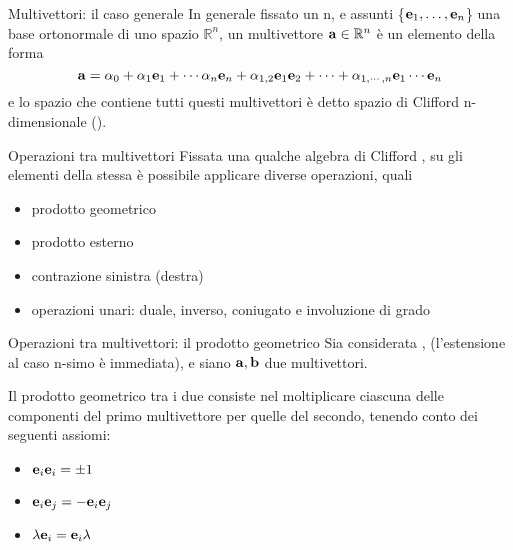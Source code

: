 \begin{frame}{Multivettori: il caso generale}
    In generale fissato un n, e assunti \{\(\mathbf{e}_{1}, \ldots, \mathbf{e}_{n}\)\}
    una base ortonormale di uno spazio \(\mathbb{R}^{n}\),
    un multivettore \(\mathbf{a} \in \mathbb{R}^{n}\) è un elemento della forma
    \[
        \mathbf{a} = \alpha_{0} + \alpha_{1}\mathbf{e}_{1} + \cdots \alpha_{n}\mathbf{e}_{n}
            + \alpha_{1,2}\mathbf{e}_{1}\mathbf{e}_{2} + \cdots 
            + \alpha_{1, \cdots, n}\mathbf{e}_{1} \cdots \mathbf{e}_{n}
    \]
    e lo spazio che contiene tutti questi multivettori è detto spazio di Clifford
    n-dimensionale (\Clifford).
\end{frame}
\begin{frame}{Operazioni tra multivettori}
    Fissata una qualche algebra di Clifford \Clifford, 
    su gli elementi della stessa è possibile applicare diverse operazioni,
    quali 
    \begin{itemize}
        \item prodotto geometrico
        \item prodotto esterno
        \item contrazione sinistra (destra)
        \item operazioni unari: duale, inverso, coniugato e involuzione di grado
    \end{itemize}
\end{frame}
\begin{frame}{Operazioni tra multivettori: il prodotto geometrico}
    Sia considerata \Clifford[2], (l'estensione al caso n-simo è immediata),
    e siano \(\mathbf{a}, \mathbf{b}\) due multivettori.

    Il prodotto geometrico tra i due consiste nel moltiplicare ciascuna delle 
    componenti del primo multivettore per quelle del secondo, 
    tenendo conto dei seguenti assiomi:
    \begin{itemize}
        \item \(\mathbf{e}_{i}\mathbf{e}_{i} = \pm 1\)
        \item \(\mathbf{e}_{i}\mathbf{e}_{j} = -\mathbf{e}_{i}\mathbf{e}_{j}\)
        \item \(\lambda\mathbf{e}_{i} = \mathbf{e}_{i}\lambda\)
    \end{itemize}
\end{frame}
